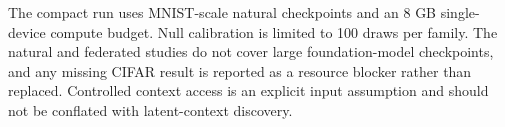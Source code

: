 The compact run uses MNIST-scale natural checkpoints and an 8 GB single-device compute budget. Null calibration is limited to 100 draws per family. The natural and federated studies do not cover large foundation-model checkpoints, and any missing CIFAR result is reported as a resource blocker rather than replaced. Controlled context access is an explicit input assumption and should not be conflated with latent-context discovery.
